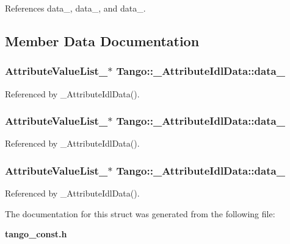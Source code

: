 References data\-\_, data\-\_, and data\-\_.



\subsection{Member Data Documentation}
\subsubsection[{data\-\_\-3}]{\setlength{\rightskip}{0pt plus 5cm}Attribute\-Value\-List\-\_$\ast$ Tango\-::\-\_\-\-Attribute\-Idl\-Data\-::data\-\_}\label{structTango_1_1__AttributeIdlData_a03bac30bf53110ff13a43eb9680a4eba}


Referenced by \-\_\-\-Attribute\-Idl\-Data().

\subsubsection[{data\-\_\-4}]{\setlength{\rightskip}{0pt plus 5cm}Attribute\-Value\-List\-\_$\ast$ Tango\-::\-\_\-\-Attribute\-Idl\-Data\-::data\-\_}\label{structTango_1_1__AttributeIdlData_a58571556b9a60dd44c88fd9b07730d5e}


Referenced by \-\_\-\-Attribute\-Idl\-Data().

\subsubsection[{data\-\_\-5}]{\setlength{\rightskip}{0pt plus 5cm}Attribute\-Value\-List\-\_$\ast$ Tango\-::\-\_\-\-Attribute\-Idl\-Data\-::data\-\_}\label{structTango_1_1__AttributeIdlData_a703cd1e84b0aed154afc5a80b96bd39d}


Referenced by \-\_\-\-Attribute\-Idl\-Data().



The documentation for this struct was generated from the following file\-:\begin{DoxyCompactItemize}
\item 
{\bf tango\-\_\-const.\-h}\end{DoxyCompactItemize}
